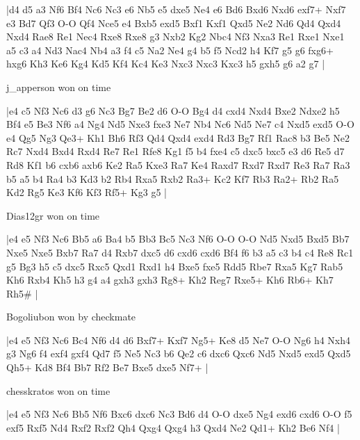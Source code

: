 \makegametitle
|d4 d5 a3 Nf6 Bf4 Nc6 Nc3 e6 Nb5 e5 dxe5 Ne4 e6 Bd6 Bxd6 Nxd6 exf7+ Nxf7 e3 Bd7 Qf3 O-O Qf4 Nce5 e4 Bxb5 exd5 Bxf1 Kxf1 Qxd5 Ne2 Nd6 Qd4 Qxd4 Nxd4 Rae8 Re1 Nec4 Rxe8 Rxe8 g3 Nxb2 Kg2 Nbc4 Nf3 Nxa3 Re1 Rxe1 Nxe1 a5 c3 a4 Nd3 Nac4 Nb4 a3 f4 c5 Na2 Ne4 g4 b5 f5 Ncd2 h4 Kf7 g5 g6 fxg6+ hxg6 Kh3 Ke6 Kg4 Kd5 Kf4 Kc4 Ke3 Nxc3 Nxc3 Kxc3 h5 gxh5 g6 a2 g7  |

\showboard

j\_apperson won on time

\makegametitle
|e4 c5 Nf3 Nc6 d3 g6 Nc3 Bg7 Be2 d6 O-O Bg4 d4 cxd4 Nxd4 Bxe2 Ndxe2 h5 Bf4 e5 Be3 Nf6 a4 Ng4 Nd5 Nxe3 fxe3 Ne7 Nb4 Nc6 Nd5 Ne7 c4 Nxd5 exd5 O-O e4 Qg5 Ng3 Qe3+ Kh1 Bh6 Rf3 Qd4 Qxd4 exd4 Rd3 Bg7 Rf1 Rac8 b3 Be5 Ne2 Rc7 Nxd4 Bxd4 Rxd4 Re7 Re1 Rfe8 Kg1 f5 b4 fxe4 c5 dxc5 bxc5 e3 d6 Re5 d7 Rd8 Kf1 b6 cxb6 axb6 Ke2 Ra5 Kxe3 Ra7 Ke4 Raxd7 Rxd7 Rxd7 Re3 Ra7 Ra3 b5 a5 b4 Ra4 b3 Kd3 b2 Rb4 Rxa5 Rxb2 Ra3+ Kc2 Kf7 Rb3 Ra2+ Rb2 Ra5 Kd2 Rg5 Ke3 Kf6 Kf3 Rf5+ Kg3 g5  |

\showboard

Dias12gr won on time

\makegametitle
|e4 e5 Nf3 Nc6 Bb5 a6 Ba4 b5 Bb3 Bc5 Nc3 Nf6 O-O O-O Nd5 Nxd5 Bxd5 Bb7 Nxe5 Nxe5 Bxb7 Ra7 d4 Rxb7 dxc5 d6 cxd6 cxd6 Bf4 f6 b3 a5 c3 b4 c4 Re8 Rc1 g5 Bg3 h5 c5 dxc5 Rxc5 Qxd1 Rxd1 h4 Bxe5 fxe5 Rdd5 Rbe7 Rxa5 Kg7 Rab5 Kh6 Rxb4 Kh5 h3 g4 a4 gxh3 gxh3 Rg8+ Kh2 Reg7 Rxe5+ Kh6 Rb6+ Kh7 Rh5\#  |

\showboard

Bogoliubon won by checkmate

\makegametitle
|e4 e5 Nf3 Nc6 Bc4 Nf6 d4 d6 Bxf7+ Kxf7 Ng5+ Ke8 d5 Ne7 O-O Ng6 h4 Nxh4 g3 Ng6 f4 exf4 gxf4 Qd7 f5 Ne5 Nc3 b6 Qe2 c6 dxc6 Qxc6 Nd5 Nxd5 exd5 Qxd5 Qh5+ Kd8 Bf4 Bb7 Rf2 Be7 Bxe5 dxe5 Nf7+  |

\showboard

chesskratos won on time

\makegametitle
|e4 e5 Nf3 Nc6 Bb5 Nf6 Bxc6 dxc6 Nc3 Bd6 d4 O-O dxe5 Ng4 exd6 cxd6 O-O f5 exf5 Rxf5 Nd4 Rxf2 Rxf2 Qh4 Qxg4 Qxg4 h3 Qxd4 Ne2 Qd1+ Kh2 Be6 Nf4  |

